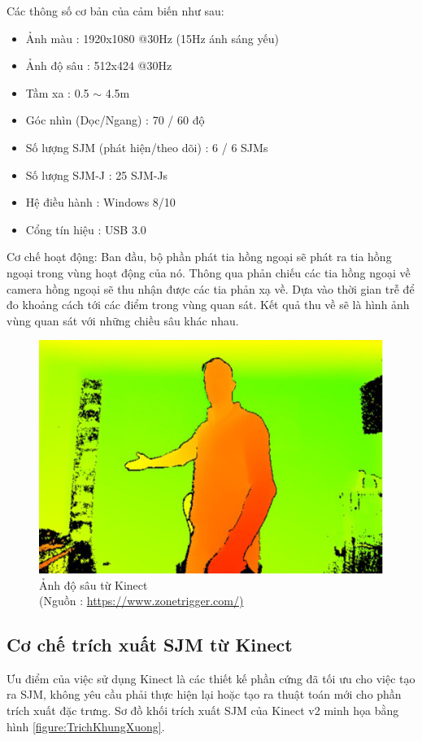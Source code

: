 Các thông số cơ bản của cảm biến như sau:
\begin{itemize}
\item Ảnh màu : 1920x1080 @30Hz (15Hz ánh sáng yếu)
\item Ảnh độ sâu : 512x424 @30Hz
\item Tầm xa : 0.5 $\sim$ 4.5m
\item Góc nhìn (Dọc/Ngang) : 70 / 60 độ
\item Số lượng SJM (phát hiện/theo dõi) : 6 / 6 SJMs
\item Số lượng SJM-J : 25 SJM-Js
\item Hệ điều hành : Windows 8/10
\item Cổng tín hiệu : USB 3.0
\end{itemize}

Cơ chế hoạt động: Ban đầu, bộ phần phát tia hồng ngoại sẽ phát ra tia hồng ngoại trong vùng hoạt động của nó. Thông qua phản chiếu các tia hồng ngoại về camera hồng ngoại sẽ thu nhận được các tia phản xạ về. Dựa vào thời gian trễ để đo khoảng cách tới các điểm trong vùng quan sát. Kết quả thu về sẽ là hình ảnh vùng quan sát với những chiều sâu khác nhau.

\FloatBarrier
\begin{figure}[htp]
\begin{center}
\includegraphics[scale=0.8]{chap3/c3_figs/depth.jpg}
\end{center}
\caption{Ảnh độ sâu từ Kinect \\(Nguồn : \url{https://www.zonetrigger.com/)}}
\label{fig:kinect}
\end{figure}
\FloatBarrier

\subsection{Cơ chế trích xuất SJM từ Kinect}
Ưu điểm của việc sử dụng Kinect là các thiết kế phần cứng đã tối ưu cho việc tạo ra SJM, không yêu cầu phải thực hiện lại hoặc tạo ra thuật toán mới cho phần trích xuất đặc trưng. Sơ đồ khối trích xuất SJM của Kinect v2 minh họa bằng hình \ref{figure:TrichKhungXuong}.

